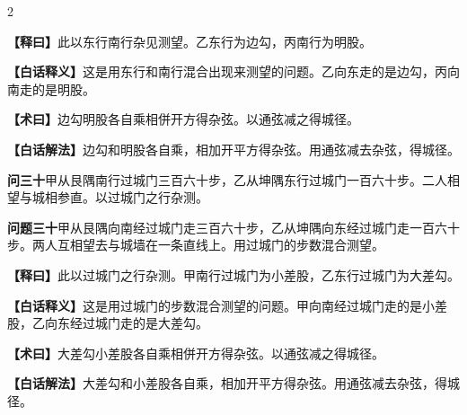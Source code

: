 \documentclass[11pt,a4paper]{article}
\newcommand{\WenQuestion}[1]{\textbf{\textcolor{classicalcolor}{#1}}}
\newcommand{\BaiQuestion}[1]{\textbf{\textcolor{moderncolor}{#1}}}
\newcommand{\WenExplain}{\textcolor{classicalcolor}{\textbf{【释曰】}}}
\newcommand{\BaiExplain}{\textcolor{moderncolor}{\textbf{【白话释义】}}}
\newcommand{\WenMethod}{\textcolor{classicalcolor}{\textbf{【术曰】}}}
\newcommand{\BaiMethod}{\textcolor{moderncolor}{\textbf{【白话解法】}}}
\begin{document}
\begin{paracol}{2}
\switchcolumn*
\begin{tcolorbox}[colback=red!5,colframe=red!30!black,boxrule=0.3pt]
\WenExplain\quad 此以东行南行杂见测望。乙东行为边勾，丙南行为明股。
\end{tcolorbox}
\switchcolumn
\begin{tcolorbox}[colback=blue!5,colframe=blue!30!black,boxrule=0.3pt]
\BaiExplain\quad 这是用东行和南行混合出现来测望的问题。乙向东走的是边勾，丙向南走的是明股。
\end{tcolorbox}

\switchcolumn*
\begin{tcolorbox}[colback=red!5,colframe=red!40!black,boxrule=0.3pt]
\WenMethod\quad 边勾明股各自乘相併开方得杂弦。以通弦减之得城径。
\end{tcolorbox}
\switchcolumn
\begin{tcolorbox}[colback=blue!5,colframe=blue!40!black,boxrule=0.3pt]
\BaiMethod\quad 边勾和明股各自乘，相加开平方得杂弦。用通弦减去杂弦，得城径。
\end{tcolorbox}

\vspace{0.8em}

\switchcolumn*
\begin{tcolorbox}[colback=red!3,colframe=red!30!black,boxrule=0.3pt]
\WenQuestion{问三十}\quad 甲从艮隅南行过城门三百六十步，乙从坤隅东行过城门一百六十步。二人相望与城相参直。以过城门之行杂测。
\end{tcolorbox}
\switchcolumn
\begin{tcolorbox}[colback=blue!3,colframe=blue!30!black,boxrule=0.3pt]
\BaiQuestion{问题三十}\quad 甲从艮隅向南经过城门走三百六十步，乙从坤隅向东经过城门走一百六十步。两人互相望去与城墙在一条直线上。用过城门的步数混合测望。
\end{tcolorbox}

\switchcolumn*
\begin{tcolorbox}[colback=red!5,colframe=red!30!black,boxrule=0.3pt]
\WenExplain\quad 此以过城门之行杂测。甲南行过城门为小差股，乙东行过城门为大差勾。
\end{tcolorbox}
\switchcolumn
\begin{tcolorbox}[colback=blue!5,colframe=blue!30!black,boxrule=0.3pt]
\BaiExplain\quad 这是用过城门的步数混合测望的问题。甲向南经过城门走的是小差股，乙向东经过城门走的是大差勾。
\end{tcolorbox}

\switchcolumn*
\begin{tcolorbox}[colback=red!5,colframe=red!40!black,boxrule=0.3pt]
\WenMethod\quad 大差勾小差股各自乘相併开方得杂弦。以通弦减之得城径。
\end{tcolorbox}
\switchcolumn
\begin{tcolorbox}[colback=blue!5,colframe=blue!40!black,boxrule=0.3pt]
\BaiMethod\quad 大差勾和小差股各自乘，相加开平方得杂弦。用通弦减去杂弦，得城径。
\end{tcolorbox}


\end{paracol}
\end{document}
